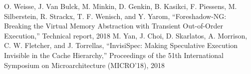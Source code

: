 \begin{thebibliography}{00}
     O. Weisse, J. Van Bulck, M. Minkin, D. Genkin, B. Kasikci, F. Piessens, M. Silberstein, R. Strackx, T. F. Wenisch, and Y. Yarom, ``Foreshadow-NG: Breaking the Virtual Memory Abstraction with Transient Out-of-Order Execution,'' Technical report, 2018
     M. Yan, J. Choi, D. Skarlatos, A. Morrison, C. W. Fletcher, and J. Torrellas, ``InvisiSpec: Making Speculative Execution Invisible in the Cache Hierarchy,'' Proceedings of the 51th International Symposium on Microarchitecture (MICRO’18), 2018
\end{thebibliography}


